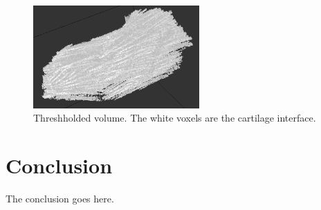 \documentclass[12pt,journal,compsoc]{IEEEtran}
\begin{document}
\begin{figure}[t!]
\centering
\includegraphics[width=2.5in]{results1}
\caption{Threshholded volume. The white voxels are the cartilage interface.}
\label{results1}
\end{figure}





\section{Conclusion}
The conclusion goes here.

\appendices
\end{document}
